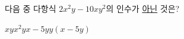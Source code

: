 다음 중 다항식 $2x^2y-10xy^2$의 인수가 \underline{아닌} 것은?
\begin{choices32}{$x$}{$y$}{$x^2y$}{$x-5y$}{$y(x-5y)$}\end{choices32}
